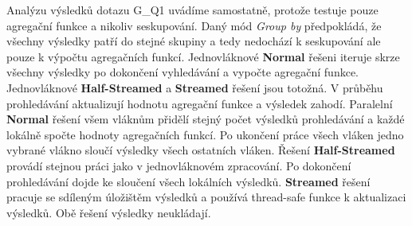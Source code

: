 Analýzu výsledků dotazu G\_Q1 uvádíme samostatně, protože testuje pouze agregační funkce a nikoliv seskupování.
Daný mód \textit{Group by} předpokládá, že všechny výsledky patří do stejné skupiny a tedy nedochází k seskupování ale pouze k výpočtu agregačních funkcí.
Jednovláknové \textbf{Normal} řešeni iteruje skrze všechny výsledky po dokončení vyhledávání a vypočte agregační funkce.
Jednovláknové \textbf{Half-Streamed} a \textbf{Streamed} řešení jsou totožná.
V průběhu prohledávání aktualizují hodnotu agregační funkce a výsledek zahodí. 
Paralelní \textbf{Normal} řešení všem vláknům přidělí stejný počet výsledků prohledávání a každé lokálně spočte hodnoty agregačních funkcí.
Po ukončení práce všech vláken jedno vybrané vlákno sloučí výsledky všech ostatních vláken. 
Řešení \textbf{Half-Streamed} provádí stejnou práci jako v jednovláknovém zpracování.
Po dokončení prohledávání dojde ke sloučení všech lokálních výsledků.
\textbf{Streamed} řešení pracuje se sdíleným úložištěm výsledků a používá thread-safe funkce k aktualizaci výsledků.
Obě řešení výsledky neukládají.

